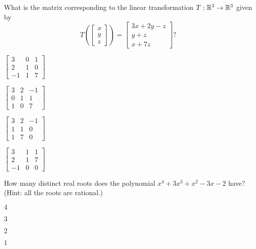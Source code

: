 \documentclass{article}
\begin{document}
\begin{readinessAssuranceTest}
\item What is the matrix corresponding to the linear transformation $T: \mathbb{R}^3 \rightarrow \mathbb{R}^3$ given by $$T\left( \begin{bmatrix} x \\ y \\ z \end{bmatrix}\right) = \begin{bmatrix} 3x+2y-z \\ y+z \\x+7z \end{bmatrix}?$$
\begin{multicols}{4}
\begin{readinessAssuranceTestChoices}
\item $\begin{bmatrix} 3 & 0 & 1 \\ 2 & 1 & 0 \\ -1 & 1 & 7 \end{bmatrix}$
\item $\begin{bmatrix} 3 & 2 & -1 \\ 0 & 1 & 1 \\ 1 & 0 & 7  \end{bmatrix}$ %
\item $\begin{bmatrix} 3 & 2 & -1 \\ 1 & 1 & 0 \\ 1 & 7 & 0 \end{bmatrix}$
\item $\begin{bmatrix}  3 & 1 & 1 \\ 2 & 1 & 7 \\ -1 & 0 & 0 \end{bmatrix}$
\end{readinessAssuranceTestChoices}
\end{multicols}

\item How many distinct real roots does the polynomial $x^4+3x^3+x^2-3x-2$ have?
(Hint: all the roots are rational.)
\begin{multicols}{4}
\begin{readinessAssuranceTestChoices}
\item $4$
\item $3$ %
\item $2$
\item $1$
\end{readinessAssuranceTestChoices}
\end{multicols}



\end{readinessAssuranceTest}
\end{document}
